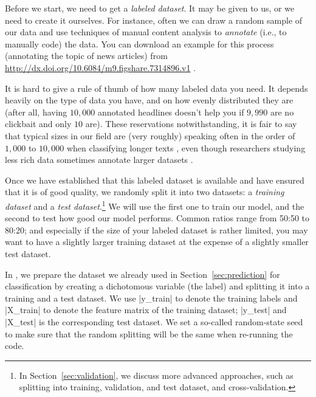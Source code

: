 Before we start, we need to get a \emph{labeled dataset}.
It may be given to us, or we need to create it ourselves.
For instance, often we can draw a random sample of our data and use techniques
of manual content analysis \citep[e.g.,][]{riffe2019analyzing} to
\emph{annotate} (i.e., to manually code) the data.
You can download an example for this process (annotating the topic of news
articles) from \url{http://dx.doi.org/10.6084/m9.figshare.7314896.v1} \citep{Vermeer2018}.

It is hard to give a rule of thumb of how many labeled data you need.
It depends heavily on the type of data you have, and on how evenly distributed
they are (after all, having $10,000$ annotated headlines doesn't help you if
$9,990$ are no clickbait and only $10$ are).
These reservations notwithstanding, it is fair to say that typical sizes in
our field are (very roughly) speaking often in the order of $1,000$ to $10,000$
when classifying longer texts \citep[see, for instance,][]{burscher2014teaching},
even though researchers studying less rich data sometimes annotate larger
datasets \citep[e.g., $60,000$ social media messages in][]{vermeer2019seeing}.

Once we have established that this labeled dataset is available and
have ensured that it is of good quality, we randomly split it into two
datasets: a \emph{training dataset} and a \emph{test
  dataset}.\footnote{In Section~\ref{sec:validation}, we discuss more
  advanced approaches, such as splitting into training, validation,
  and test dataset, and cross-validation.}  We will use the first one
to train our model, and the second to test how good our model
performs. Common ratios range from 50:50 to 80:20; and especially if
the size of your labeled dataset is rather limited, you may want to
have a slightly larger training dataset at the expense of a slightly
smaller test dataset.

In , we prepare the dataset we already used in
Section~\ref{sec:prediction} for classification by creating a
dichotomous variable (the label) and splitting it into a training and
a test dataset. We use |y_train| to denote the training labels and
|X_train| to denote the feature matrix of the training dataset;
|y_test| and |X_test| is the corresponding test dataset. We set a
so-called random-state seed to make sure that the random splitting
will be the same when re-running the code.


